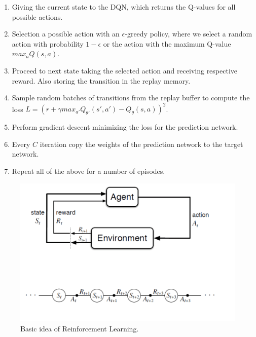 \documentclass[runningheads,envcountsect]{llncs}
\begin{document}
\begin{enumerate}
	\item Giving the current state to the DQN, which returns the Q-values for all possible actions.
	\item Selection a possible action with an $\epsilon$-greedy policy, where we select a random action with probability $1-\epsilon$ or the action with the maximum Q-value $max_a Q(s,a)$.
	\item Proceed to next state taking the selected action and receiving respective reward. Also storing the transition in the replay memory.
	\item Sample random batches of transitions from the replay buffer to compute the loss $L= (r + \gamma max_{a'} Q_{\theta'}(s', a') - Q_\theta(s, a))^2$.
	\item Perform gradient descent minimizing the loss for the prediction network.
	\item Every $C$ iteration copy the weights of the prediction network to the target network.
	\item Repeat all of the above for a number of episodes.
\end{enumerate}

\begin{figure}[h!]
  \centering
  \includegraphics[scale=0.7]{img/rl_base.png}
  \caption{Basic idea of Reinforcement Learning.}
  \label{fig:rl}
\end{figure}
\end{document}
